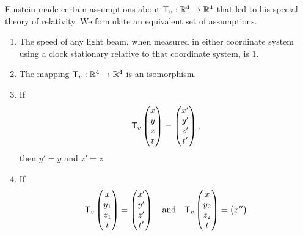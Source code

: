 \begin{ax}\label{6.9.2}
  Einstein made certain assumptions about \(\mathsf{T}_v : \mathbb{R}^4 \to \mathbb{R}^4\) that led to his special theory of relativity.
  We formulate an equivalent set of assumptions.
  \begin{enumerate}[label=(R \arabic*)]
    \item The speed of any light beam, when measured in either coordinate system using a clock stationary relative to that coordinate system, is \(1\).
    \item The mapping \(\mathsf{T}_v : \mathbb{R}^4 \to \mathbb{R}^4\) is an isomorphism.
    \item If
          \[
            \mathsf{T}_v\begin{pmatrix}
              x \\
              y \\
              z \\
              t
            \end{pmatrix} = \begin{pmatrix}
              x' \\
              y' \\
              z' \\
              t'
            \end{pmatrix},
          \]
          then \(y' = y\) and \(z' = z\).
    \item If
          \[
            \mathsf{T}_v\begin{pmatrix}
              x   \\
              y_1 \\
              z_1 \\
              t
            \end{pmatrix} = \begin{pmatrix}
              x' \\
              y' \\
              z' \\
              t'
            \end{pmatrix} \quad \text{and} \quad \mathsf{T}_v\begin{pmatrix}
              x   \\
              y_2 \\
              z_2 \\
              t
            \end{pmatrix} = \begin{pmatrix}
              x'' \\

\end{pmatrix}\]
\end{enumerate}
\end{ax}
